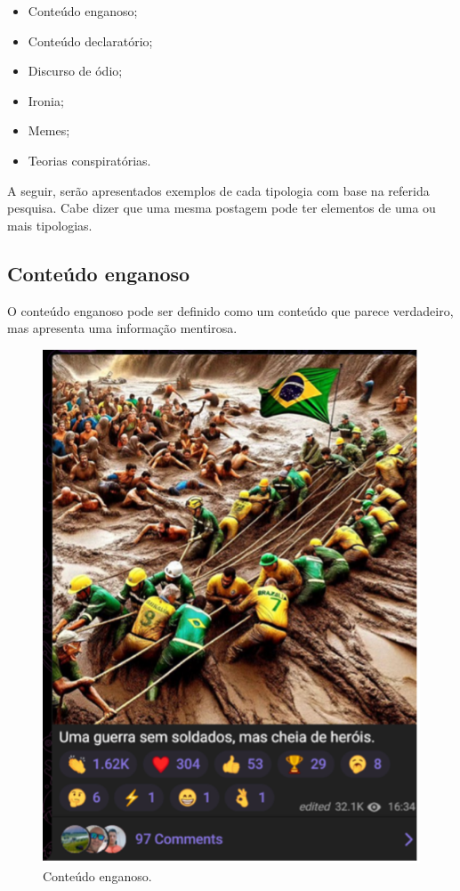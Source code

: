 \documentclass[portuguese]{textolivre}
\begin{document}
\begin{itemize}
    \item Conteúdo enganoso; 
    \item Conteúdo declaratório; 
    \item Discurso de ódio; 
    \item Ironia; 
    \item Memes; 
    \item Teorias conspiratórias.
\end{itemize}

A seguir, serão apresentados exemplos de cada tipologia com base na referida pesquisa. Cabe dizer que uma mesma postagem pode ter elementos de uma ou mais tipologias. 

\subsection{Conteúdo enganoso}
O conteúdo enganoso pode ser definido como um conteúdo que parece verdadeiro, mas apresenta uma informação mentirosa.

\begin{figure}[ht]
    \centering
    \begin{minipage}{0.45\textwidth}
        \centering
        \includegraphics[width=\textwidth]{Imagens/Fig38.png}
        \caption{Conteúdo enganoso.}
        \label{fig-38}
    \end{minipage}
    \end{figure}
\end{document}
